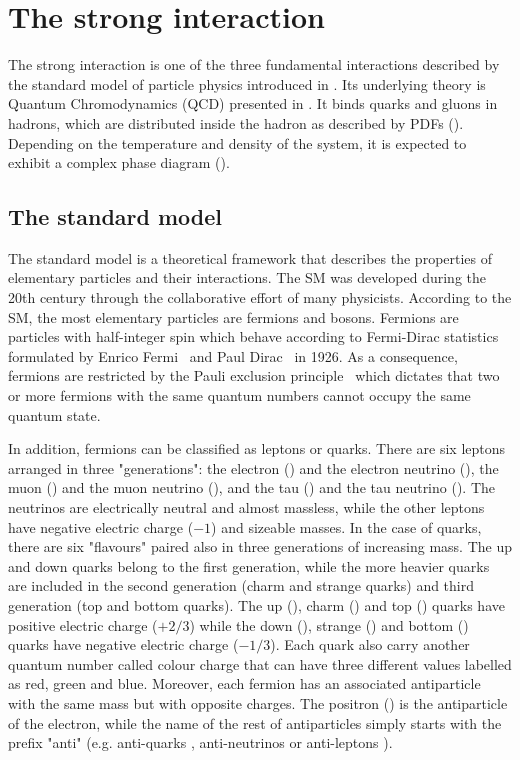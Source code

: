 \section{The strong interaction}\label{sec:Physics_SI}

The strong interaction is one of the three fundamental interactions described by the standard model of particle physics introduced in . Its underlying theory is Quantum Chromodynamics (QCD) presented in . It binds quarks and gluons in hadrons, which are distributed inside the hadron as described by PDFs (). Depending on the temperature and density of the system, it is expected to exhibit a complex phase diagram ().


\subsection{The standard model}\label{sec:Physics_SI_SM}

The standard model is a theoretical framework that describes the properties of elementary particles and their interactions. The SM was developed during the 20th century through the collaborative effort of many physicists. According to the SM, the most elementary particles are fermions and bosons. Fermions are particles with half-integer spin which behave according to Fermi-Dirac statistics formulated by Enrico Fermi~\cite{FermiDiracStatistics_1} and Paul Dirac~\cite{FermiDiracStatistics_2} in 1926. As a consequence, fermions are restricted by the Pauli exclusion principle~\cite{PauliExclusion} which dictates that two or more fermions with the same quantum numbers cannot occupy the same quantum state.

In addition, fermions can be classified as leptons or quarks. There are six leptons arranged in three "generations": the electron (\PGem) and the electron neutrino (\PGnGe), the muon (\PGmm) and the muon neutrino (\PGnGm), and the tau (\PGtm) and the tau neutrino (\PGnGt). The neutrinos are electrically neutral and almost massless, while the other leptons have negative electric charge ($-1$) and sizeable masses. In the case of quarks, there are six "flavours" paired also in three generations of increasing mass. The up and down quarks belong to the first generation, while the more heavier quarks are included in the second generation (charm and strange quarks) and third generation (top and bottom quarks). The up (\cPqu), charm (\cPqc) and top (\cPqt) quarks have positive electric charge ($+2/3$) while the down (\cPqd), strange (\cPqs) and bottom (\cPqb) quarks have negative electric charge ($-1/3$). Each quark also carry another quantum number called colour charge that can have three different values labelled as red, green and blue. Moreover, each fermion has an associated antiparticle with the same mass but with opposite charges. The positron (\PGep) is the antiparticle of the electron, while the name of the rest of antiparticles simply starts with the prefix "anti" (e.g. anti-quarks \cPaq, anti-neutrinos \PAGn or anti-leptons \PGlp).


